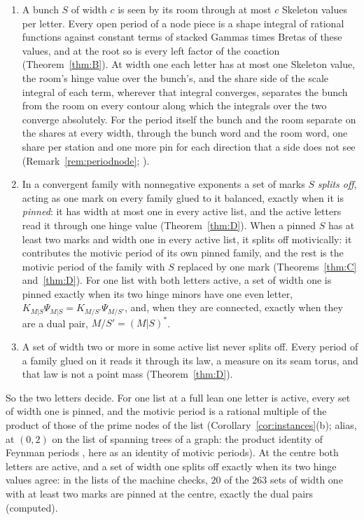 \documentclass[11pt]{article}
\theoremstyle{plain}
\theoremstyle{definition}
\theoremstyle{remark}
\begin{document}
\begin{enumerate}[label=(\arabic*)]
\item A bunch $S$ of width $c$ is seen by its room through at most $c$ Skeleton values per letter. Every open period of a node piece is a shape integral of rational functions against constant terms of stacked Gammas times Bretas of these values, and at the root so is every left factor of the coaction (Theorem~\ref{thm:B}). At width one each letter has at most one Skeleton value, the room's hinge value over the bunch's, and the share side of the scale integral of each term, wherever that integral converges, separates the bunch from the room on every contour along which the integrals over the two converge absolutely. For the period itself the bunch and the room separate on the shares at every width, through the bunch word and the room word, one share per station and one more pin for each direction that a side does not see (Remark~\ref{rem:periodnode}; \cite[Thm.~27.9(iii), p.~230; Thm.~27.11, p.~232]{F}).
\item In a convergent family with nonnegative exponents a set of marks $S$ \emph{splits off}, acting as one mark on every family glued to it balanced, exactly when it is \emph{pinned}: it has width at most one in every active list, and the active letters read it through one hinge value (Theorem~\ref{thm:D}). When a pinned $S$ has at least two marks and width one in every active list, it splits off motivically: it contributes the motivic period of its own pinned family, and the rest is the motivic period of the family with $S$ replaced by one mark (Theorems~\ref{thm:C} and~\ref{thm:D}). For one list with both letters active, a set of width one is pinned exactly when its two hinge minors have one even letter, $K_{M|S}\Psi_{M|S}=K_{M/S'}\Psi_{M/S'}$, and, when they are connected, exactly when they are a dual pair, $M/S'=(M|S)^\ast$.
\item A set of width two or more in some active list never splits off. Every period of a family glued on it reads it through its law, a measure on its seam torus, and that law is not a point mass (Theorem~\ref{thm:D}).
\end{enumerate}
So the two letters decide. For one list at a full lean one letter is active, every set of width one is pinned, and the motivic period is a rational multiple of the product of those of the prime nodes of the list (Corollary~\ref{cor:instances}(b); alias, at $(0,2)$ on the list of spanning trees of a graph: the product identity of Feynman periods \cite[Thm.~2.10]{Sch}, here as an identity of motivic periods). At the centre both letters are active, and a set of width one splits off exactly when its two hinge values agree: in the lists of the machine checks, $20$ of the $263$ sets of width one with at least two marks are pinned at the centre, exactly the dual pairs (computed).
\end{document}
